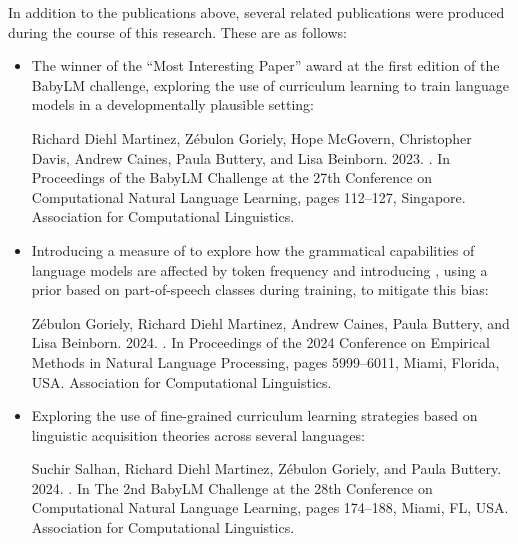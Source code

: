 In addition to the publications above, several related publications were produced during the course of this research. These are as follows:

\begin{itemize}
\item The winner of the \enquote{Most Interesting Paper} award at the first edition of the BabyLM challenge, exploring the use of curriculum learning to train language models in a developmentally plausible setting:
\begin{mdframed}[linewidth=1pt]
    Richard Diehl Martinez, Z\'ebulon Goriely, Hope McGovern, Christopher Davis, Andrew Caines, Paula Buttery, and Lisa Beinborn. 2023. \href{https://aclanthology.org/2023.conll-babylm.10/}{}. In Proceedings of the BabyLM Challenge at the 27th Conference on Computational Natural Language Learning, pages 112--127, Singapore. Association for Computational Linguistics.
\end{mdframed}

\item Introducing a measure of  to explore how the grammatical capabilities of language models are affected by token frequency and introducing , using a prior based on part-of-speech classes during training, to mitigate this bias:
\begin{mdframed}[linewidth=1pt]
    Z\'ebulon Goriely, Richard Diehl Martinez, Andrew Caines, Paula Buttery, and Lisa Beinborn. 2024. \href{https://aclanthology.org/2024.emnlp-main.344/}{}. In Proceedings of the 2024 Conference on Empirical Methods in Natural Language Processing, pages 5999–6011, Miami, Florida, USA. Association for Computational Linguistics.
\end{mdframed}

\item Exploring the use of fine-grained curriculum learning strategies based on linguistic acquisition theories across several languages:
\begin{mdframed}[linewidth=1pt]
    Suchir Salhan, Richard Diehl Martinez, Z\'ebulon Goriely, and Paula Buttery. 2024. \href{https://aclanthology.org/2024.conll-babylm.15/}{}. In The 2nd BabyLM Challenge at the 28th Conference on Computational Natural Language Learning, pages 174--188, Miami, FL, USA. Association for Computational Linguistics.
\end{mdframed}


\end{itemize}
